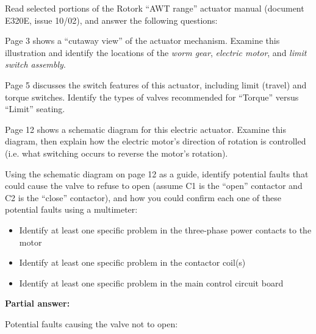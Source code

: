

Read selected portions of the Rotork ``AWT range'' actuator manual (document E320E, issue 10/02), and answer the following questions:

\vskip 10pt

Page 3 shows a ``cutaway view'' of the actuator mechanism.  Examine this illustration and identify the locations of the {\it worm gear}, {\it electric motor}, and {\it limit switch assembly}.

\vskip 10pt

Page 5 discusses the switch features of this actuator, including limit (travel) and torque switches.  Identify the types of valves recommended for ``Torque'' versus ``Limit'' seating.

\vskip 10pt

Page 12 shows a schematic diagram for this electric actuator.  Examine this diagram, then explain how the electric motor's direction of rotation is controlled (i.e. what switching occurs to reverse the motor's rotation).

\vskip 10pt

Using the schematic diagram on page 12 as a guide, identify potential faults that could cause the valve to refuse to open (assume C1 is the ``open'' contactor and C2 is the ``close'' contactor), and how you could confirm each one of these potential faults using a multimeter:

\begin{itemize}
\item{} Identify at least one specific problem in the three-phase power contacts to the motor
\item{} Identify at least one specific problem in the contactor coil(s)
\item{} Identify at least one specific problem in the main control circuit board
\end{itemize}







\noindent
{\bf Partial answer:}

\vskip 10pt

Potential faults causing the valve not to open:

